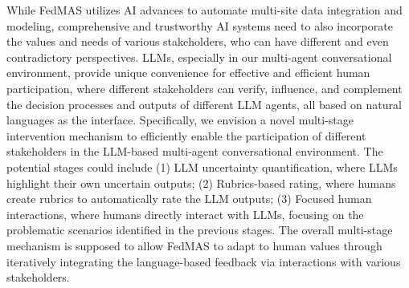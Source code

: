 While FedMAS utilizes AI advances to automate multi-site data integration and modeling, comprehensive and trustworthy AI systems need to also incorporate the values and needs of various stakeholders, who can have different and even contradictory perspectives. LLMs, especially in our multi-agent conversational environment, provide unique convenience for effective and efficient human participation, where different stakeholders can verify, influence, and complement the decision processes and outputs of different LLM agents, all based on natural languages as the interface.
Specifically, we envision a novel multi-stage intervention mechanism to efficiently enable the participation of different stakeholders in the LLM-based multi-agent conversational environment. The potential stages could include (1) LLM uncertainty quantification, where LLMs highlight their own uncertain outputs; (2) Rubrics-based rating, where humans create rubrics to automatically rate the LLM outputs; (3) Focused human interactions, where humans directly interact with LLMs, focusing on the problematic scenarios identified in the previous stages. The overall multi-stage mechanism is supposed to allow FedMAS to adapt to human values through iteratively integrating the language-based feedback via interactions with various stakeholders. 


